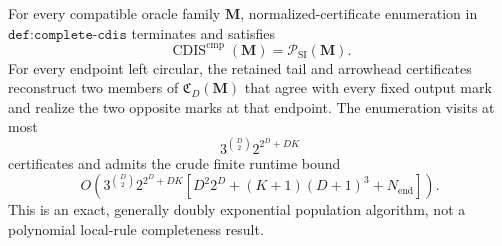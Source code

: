 For every compatible oracle family \(\mathbf M\), normalized-certificate enumeration in \(\texttt{def:complete-cdis}\) terminates and satisfies
\[
\operatorname{CDIS}^{\mathrm{cmp}}(\mathbf M)=\mathcal P_{\mathrm{SI}}(\mathbf M).
\]
For every endpoint left circular, the retained tail and arrowhead certificates reconstruct two members of \(\mathfrak C_D(\mathbf M)\) that agree with every fixed output mark and realize the two opposite marks at that endpoint.  The enumeration visits at most
\[
3^{\binom D2}2^{2^D+DK}
\]
certificates and admits the crude finite runtime bound
\[
O\!\left(3^{\binom D2}2^{2^D+DK}
\left[D^2 2^D+(K+1)(D+1)^3+N_{\mathrm{end}}\right]\right).
\]
This is an exact, generally doubly exponential population algorithm, not a polynomial local-rule completeness result.